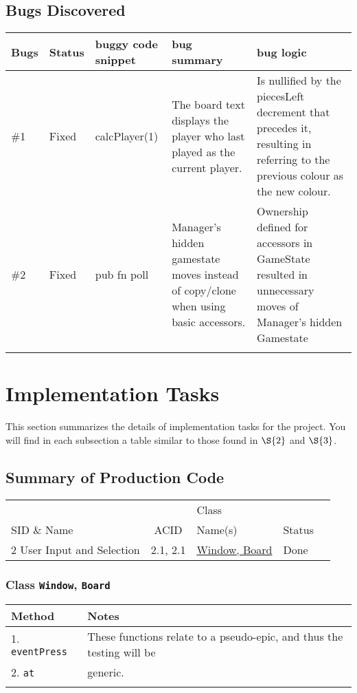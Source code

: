 \documentclass[11pt]{article}
\begin{document}
\subsection{Bugs Discovered}
\label{sec:orgfd41f98}
\begin{center}
\begin{tabular}{|l|l|m{2.0cm}|m{3.5cm}|m{5.0cm}|}
Bugs & Status & buggy code snippet & bug summary & bug logic\\
\hline
\#1 & Fixed & calcPlayer(1) & The board text displays the player who last played as the current player. & Is nullified by the piecesLeft decrement that precedes it, resulting in referring to the previous colour as the new colour.\\
\hline
\#2 & Fixed & pub fn poll & Manager's hidden gamestate moves instead of copy/clone when using basic accessors. & Ownership defined for accessors in GameState resulted in unnecessary moves of Manager's hidden Gamestate\\
 &  &  &  & \\
\end{tabular}
\end{center}


\section{Implementation Tasks}
\label{sec:org830c270}
This section summarizes the details of implementation tasks for the project. You will find in each
subsection a table similar to those found in \hyperref[sec:orgcfd7241]{\(\S{2}\)} and \hyperref[sec:org9bfcf82]{\(\S{3}\)}.

\subsection{Summary of Production Code}
\label{sec:org6448f68}

\begin{center}
\begin{tabular}{|p{4.5cm}|c|p{3.5cm}|p{4.5cm}|c|}
 &  & Class & \\
SID \& Name & ACID & Name(s) & Status\\
\hline
2 User Input and Selection & 2.1, 2.1 & \hyperref[sec:org3c84eb0]{Window, Board} & Done\\
\end{tabular}
\end{center}

\subsubsection{Class \texttt{Window}, \texttt{Board}}
\label{sec:org3c84eb0}
\begin{center}
\begin{tabular}{|l|l|}
Method & Notes\\
\hline
1. \texttt{eventPress} & These functions relate to a pseudo-epic, and thus the testing will be\\
2. \texttt{at} & generic.\\
 & \\
\end{tabular}
\end{center}
\end{document}
